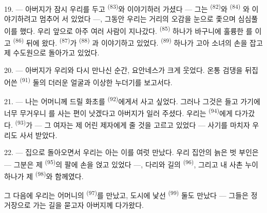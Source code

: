 19. --- 아버지가 잠시 우리를 두고  \textsuperscript{(83)}와 이야기하러
가셨다 — 그는  \textsuperscript{(82)}와  \textsuperscript{(84)}
와 이야기하려고 멈추어 서 있었다 —, 그동안 우리는 거리의 오감을 눈으로 좇으며 심심풀이를
했다. 우리 앞으로 아주 여러 사람이 지나갔다.  \textsuperscript{(85)}
하나가 바구니에 훌륭한 를 이고  \textsuperscript{(86)}
뒤에 왔다.  \textsuperscript{(87)}가  \textsuperscript{(88)}
과 이야기하고 있었다.  \textsuperscript{(89)} 하나가 고아 소녀의 손을 잡고 제
수도원으로 돌아가고 있었다.

\VUsaut{3.0mm}

20. --- 아버지가 우리와 다시 만나신 순간, 요안네스가 크게 웃었다. 온통 검댕을 뒤집어쓴
 \textsuperscript{(91)} 둘의 더러운 얼굴과 이상한 누더기를 보고서다.

21. --- 나는 어머니께 드릴 화초를  \textsuperscript{(92)}에게서
사고 싶었다. 그러나 그것은 들고 가기에 너무 무거우니 를 사는 편이 낫겠다고
아버지가 일러 주셨다. 우리는  \textsuperscript{(94)}에게 다가갔다.
 \textsuperscript{(93)}가 — 그 여자는 제 어린 제자에게 줄 것을 고르고
있었다 — 사기를 마치자 우리도 사서 받았다.

22. --- 집으로 돌아오면서 우리는 아는 이를 여럿 만났다. 우리 집안의 늙은 벗 부인은 —
그분은 제  \textsuperscript{(95)}의 팔에 손을 얹고 있었다 —, 다리와 길의
 \textsuperscript{(96)}, 그리고 내 사촌 누이 하나가 제 
\textsuperscript{(98)}와 함께였다.

그 다음에 우리는 어머니의  \textsuperscript{(97)}를 만났고, 도시에
낯선  \textsuperscript{(99)} 둘도 만났다 — 그들은 정거장으로 가는 길을 묻고자
아버지께 다가왔다.

\VUsaut{6.0mm}
\VUfilet{22mm}
